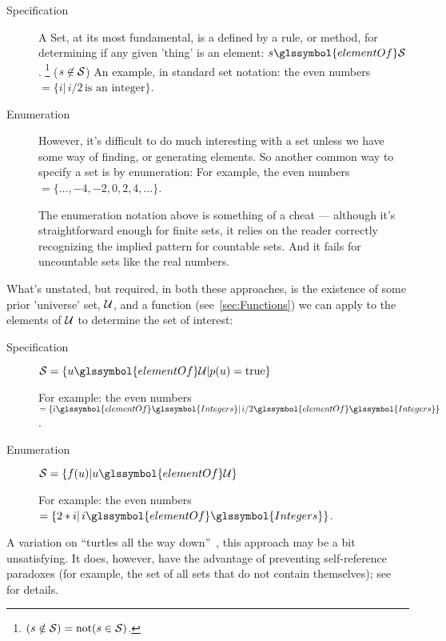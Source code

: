 \begin{description}

\item[Specification]

A \gls{Set}, at its most fundamental, is a defined by a rule,
or method,
for determining if any given 'thing' is an element: 
$s \glssymbol{elementOf} \aSet{S}$.
\footnote{$(s \notin \mathcal{S}) = \text{not}(s \in \mathcal{S})$.}
($s \not\in \mathcal{S}$)
An example, in standard set notation:
the even numbers $= \{ i | \, i/2 \, \text{is an integer}\}$.

\item[Enumeration]

However, it's difficult to do much interesting with a set
unless we have some way of finding, or generating elements.
So another common way to specify a set is by enumeration:
For example, the even numbers $= \{ \ldots, -4, -2, 0, 2 ,4,
\ldots \}$.

The enumeration notation above is something of a cheat ---
although it's straightforward enough for finite sets, it relies on
the reader correctly recognizing the implied pattern for countable
sets.
And it fails for uncountable sets like the real numbers.

\end{description}

What's unstated, but required, in both these approaches, is the
existence of some prior 'universe' set, $\mathcal{U}$, and a function
(see~\autoref{sec:Functions}) we can apply to the elements of
$\mathcal{U}$ to determine the set of interest:

\begin{description}
\item[Specification] 
$\aSet{S} =
\{ u \glssymbol{elementOf} \aSet{U} | p(u) = \text{true} \}$ 

For example: the even numbers $= \{ i \glssymbol{elementOf} 
\glssymbol{Integers} |
 \, i/2 \glssymbol{elementOf} \glssymbol{Integers} \}$.

\item[Enumeration]
$\aSet{S} =
\{ f(u) | u \glssymbol{elementOf} \aSet{U} \}$ 

For example: the even numbers $= \{ 2*i | \, i
\glssymbol{elementOf} \glssymbol{Integers} \}$.

\end{description}
A variation on 
``turtles all the way down''~\cite{Munroe:2014:XKCDTurtles, wiki:Turtles},
this approach may be a bit unsatisfying.
It does, however, have the advantage of preventing self-reference
paradoxes (for example, 
the set of all sets that do not contain themselves); 
see~\cite[Halmos, \textit{Naive Set Theory,} section 2]
{Halmos1960Naive} for details.

